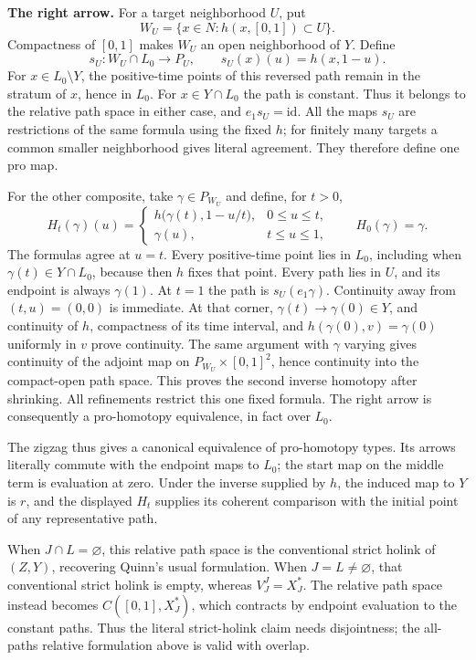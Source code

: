 \textbf{The right arrow.} For a target neighborhood \(U\), put
\[
 W_U=\{x\in N:h(x,[0,1])\subset U\}.
\]
Compactness of \([0,1]\) makes \(W_U\) an open neighborhood of \(Y\). Define
\[
 s_U:W_U\cap L_0\longrightarrow P_U,
 \qquad s_U(x)(u)=h(x,1-u).
\]
For \(x\in L_0\setminus Y\), the positive-time points of this reversed path remain in the stratum of \(x\), hence in \(L_0\). For \(x\in Y\cap L_0\) the path is constant. Thus it belongs to the relative path space in either case, and \(e_1s_U=\mathrm{id}\). All the maps \(s_U\) are restrictions of the same formula using the fixed \(h\); for finitely many targets a common smaller neighborhood gives literal agreement. They therefore define one pro map.

For the other composite, take \(\gamma\in P_{W_U}\) and define, for \(t>0\),
\[
 H_t(\gamma)(u)=
 \begin{cases}
 h\bigl(\gamma(t),1-u/t\bigr),&0\le u\le t,\\
 \gamma(u),&t\le u\le1,
 \end{cases}
 \qquad H_0(\gamma)=\gamma.
\]
The formulas agree at \(u=t\). Every positive-time point lies in \(L_0\), including when \(\gamma(t)\in Y\cap L_0\), because then \(h\) fixes that point. Every path lies in \(U\), and its endpoint is always \(\gamma(1)\). At \(t=1\) the path is \(s_U(e_1\gamma)\). Continuity away from \((t,u)=(0,0)\) is immediate. At that corner, \(\gamma(t)\to\gamma(0)\in Y\), and continuity of \(h\), compactness of its time interval, and \(h(\gamma(0),v)=\gamma(0)\) uniformly in \(v\) prove continuity. The same argument with \(\gamma\) varying gives continuity of the adjoint map on \(P_{W_U}\times[0,1]^2\), hence continuity into the compact-open path space. This proves the second inverse homotopy after shrinking. All refinements restrict this one fixed formula. The right arrow is consequently a pro-homotopy equivalence, in fact over \(L_0\).

The zigzag thus gives a canonical equivalence of pro-homotopy types. Its arrows literally commute with the endpoint maps to \(L_0\); the start map on the middle term is evaluation at zero. Under the inverse supplied by \(h\), the induced map to \(Y\) is \(r\), and the displayed \(H_t\) supplies its coherent comparison with the initial point of any representative path.

When \(J\cap L=\varnothing\), this relative path space is the conventional strict holink of \((Z,Y)\), recovering Quinn's usual formulation. When \(J=L\ne\varnothing\), that conventional strict holink is empty, whereas \(V_J^J=X_J^*\). The relative path space instead becomes \(C([0,1],X_J^*)\), which contracts by endpoint evaluation to the constant paths. Thus the literal strict-holink claim needs disjointness; the all-paths relative formulation above is valid with overlap.

